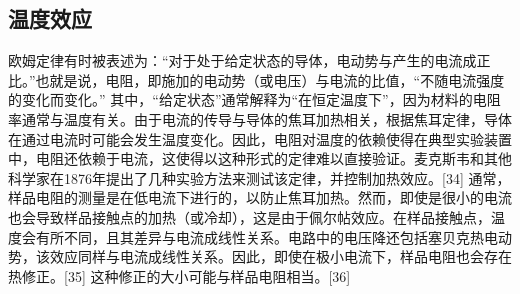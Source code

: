 \subsection{温度效应}  
欧姆定律有时被表述为：“对于处于给定状态的导体，电动势与产生的电流成正比。”也就是说，电阻，即施加的电动势（或电压）与电流的比值，“不随电流强度的变化而变化。” 其中，“给定状态”通常解释为“在恒定温度下”，因为材料的电阻率通常与温度有关。由于电流的传导与导体的焦耳加热相关，根据焦耳定律，导体在通过电流时可能会发生温度变化。因此，电阻对温度的依赖使得在典型实验装置中，电阻还依赖于电流，这使得以这种形式的定律难以直接验证。麦克斯韦和其他科学家在1876年提出了几种实验方法来测试该定律，并控制加热效应。[34] 通常，样品电阻的测量是在低电流下进行的，以防止焦耳加热。然而，即使是很小的电流也会导致样品接触点的加热（或冷却），这是由于佩尔帖效应。在样品接触点，温度会有所不同，且其差异与电流成线性关系。电路中的电压降还包括塞贝克热电动势，该效应同样与电流成线性关系。因此，即使在极小电流下，样品电阻也会存在热修正。[35] 这种修正的大小可能与样品电阻相当。[36]